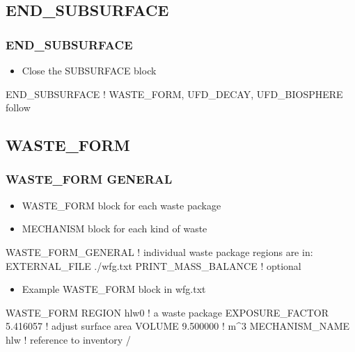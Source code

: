 \documentclass{beamer}
\newcommand\bluecomment[1]{{{\color{blue} #1}}}
\begin{document}
\subsection{END\_SUBSURFACE}
\begin{frame}[fragile]\frametitle{END\_SUBSURFACE}

\begin{itemize}
  \item Close the SUBSURFACE block
\end{itemize}

\begin{semiverbatim}
END_SUBSURFACE \bluecomment{! WASTE_FORM, UFD_DECAY, UFD_BIOSPHERE follow}
\end{semiverbatim}
\end{frame}

\subsection{WASTE\_FORM}
\begin{frame}[fragile]\frametitle{WASTE\_FORM GENERAL}

\begin{itemize}
  \item WASTE\_FORM block for each waste package
  \item MECHANISM block for each kind of waste
\end{itemize}

\begin{semiverbatim}\small
WASTE_FORM_GENERAL
  \bluecomment{! individual waste package regions are in:}
  EXTERNAL_FILE ./wfg.txt
  PRINT_MASS_BALANCE \bluecomment{! optional}
\end{semiverbatim}

\begin{itemize}\small
  \item Example WASTE\_FORM block in wfg.txt
\end{itemize}

\begin{semiverbatim}
  WASTE_FORM
     REGION hlw0 \bluecomment{! a waste package}
     EXPOSURE_FACTOR 5.416057 \bluecomment{! adjust surface area}
     VOLUME 9.500000 \bluecomment{! m^3}
     MECHANISM_NAME hlw \bluecomment{! reference to inventory}
  /
\end{semiverbatim}
\end{frame}
\end{document}
